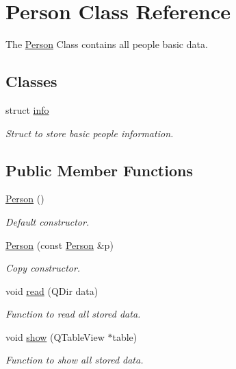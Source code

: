 \hypertarget{class_person}{\section{Person Class Reference}
\label{class_person}
}


The \hyperlink{class_person}{Person} Class contains all people basic data.  


\subsection*{Classes}
\begin{DoxyCompactItemize}
\item 
struct \hyperlink{struct_person_1_1info}{info}
\begin{DoxyCompactList}\small\item\em Struct to store basic people information. \end{DoxyCompactList}\end{DoxyCompactItemize}
\subsection*{Public Member Functions}
\begin{DoxyCompactItemize}
\item 
\hyperlink{class_person_a0397c6f89fafc12e738923f612bc41a3}{Person} ()
\begin{DoxyCompactList}\small\item\em Default constructor. \end{DoxyCompactList}\item 
\hyperlink{class_person_a847845e2e214a89e790c584678f1ea97}{Person} (const \hyperlink{class_person}{Person} \&p)
\begin{DoxyCompactList}\small\item\em Copy constructor. \end{DoxyCompactList}\item 
void \hyperlink{class_person_a98c73f33a51b80cc9296a949f2fc5cf3}{read} (Q\+Dir data)
\begin{DoxyCompactList}\small\item\em Function to read all stored data. \end{DoxyCompactList}\item 
void \hyperlink{class_person_ac89ee9923a0b4a874be8f5901e35b753}{show} (Q\+Table\+View $\ast$table)
\begin{DoxyCompactList}\small\item\em Function to show all stored data. \end{DoxyCompactList}\end{DoxyCompactItemize}
